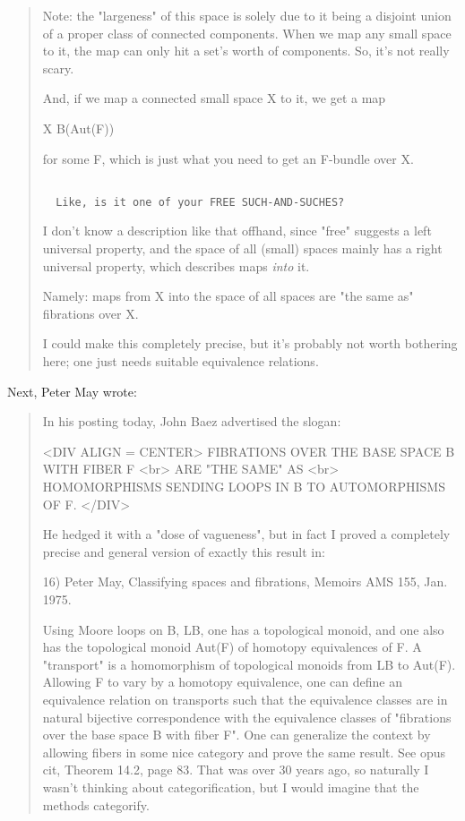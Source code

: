\begin{quote}
 Note: the "largeness" of this space is solely due to it being a 
 disjoint union of a proper class of connected components.  When 
 we map any small space to it, the map can only hit a set's worth
 of components.  So, it's not really scary.

 And, if we map a connected small space X to it, we get a map 

 X \to  B(Aut(F)) 

 for some F, which is just what you need to get an F-bundle over X.


\begin{verbatim}

  Like, is it one of your FREE SUCH-AND-SUCHES?
\end{verbatim}
    
 I don't know a description like that offhand, since "free" suggests
 a left universal property, and the space of all (small) spaces mainly 
 has a right universal property, which describes maps \emph{into} it.

 Namely: maps from X into the space of all spaces are "the same as"
 fibrations over X.

I could make this completely precise, but it's probably not worth bothering
here; one just needs suitable equivalence relations.

\end{quote}
Next, Peter May wrote: 

\begin{quote}
 In his posting today, John Baez advertised the slogan:

<DIV ALIGN = CENTER>
              FIBRATIONS OVER THE BASE SPACE B WITH FIBER F <br>
                           ARE "THE SAME" AS <br>
          HOMOMORPHISMS SENDING LOOPS IN B TO AUTOMORPHISMS OF F.
</DIV>

 He hedged it with a "dose of vagueness", but in fact I proved a
 completely precise and general version of exactly this result in:

16) Peter May, Classifying spaces and fibrations, 
Memoirs AMS 155, Jan. 1975.  

 Using
 Moore loops on B, LB, one has a topological monoid, and one also has the
 topological monoid Aut(F) of homotopy equivalences of F.  
 A "transport"
 is a homomorphism of topological monoids from LB to Aut(F).  Allowing F to
 vary by a homotopy equivalence, one can define an equivalence relation on
 transports such that the equivalence classes are in natural bijective
 correspondence with the equivalence classes of "fibrations over the base
 space B with fiber F".  One can generalize the context by allowing fibers
 in some nice category and prove the same result.  See opus cit, Theorem
 14.2, page 83.  That was over 30 years ago, so naturally I wasn't thinking
 about categorification, but I would imagine that the methods categorify.
\end{quote}

